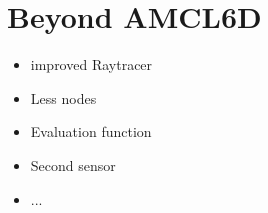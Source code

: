 \documentclass[Thesis.tex]{subfiles}
\begin{document}
\chapter{Beyond AMCL6D}
\begin{itemize}
	\item improved Raytracer
  \item Less nodes
  \item Evaluation function
  \item Second sensor
  \item ...
\end{itemize}
\end{document}
